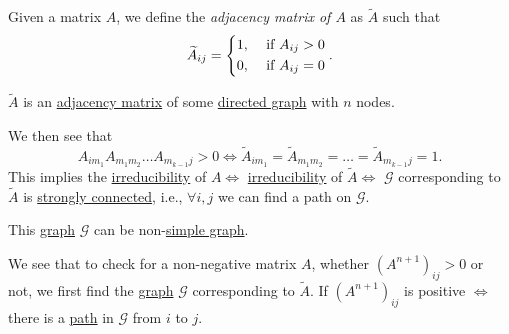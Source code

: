 \begin{definition}\label{def:adjacency-matrix-of-a-matrix}
	Given a matrix \(A\), we define the \emph{adjacency matrix of \(A\)} as \(\widetilde{A} \) such that
	\[
		\widetilde{A}_{ij} = \begin{dcases}
			1, & \text{ if }A_{ij}>0 \\
			0, & \text{ if }A_{ij}=0 \\
		\end{dcases}.
	\]
\end{definition}

\begin{note}
	\(\widetilde{A} \) is an \hyperref[def:adjacency-matrix]{adjacency matrix} of some \hyperref[def:directed-graph]{directed graph} with \(n\) nodes.
\end{note}

We then see that
\[
	A_{im_1} A_{m_1 m_2}\ldots A_{m_{k-1} j} > 0 \iff \widetilde{A}_{im_1} = \widetilde{A}_{m_1 m_2} = \ldots = \widetilde{A}_{m_{k-1}j} = 1.
\]
This implies the \hyperref[def:irreducible]{irreducibility} of \(A \iff\) \hyperref[def:irreducible]{irreducibility} of \(\widetilde{A}\iff\) \(\mathcal{G}\) corresponding to \(\widetilde{A}\) is \hyperref[def:strongly-connected]{strongly connected}, i.e., \(\forall  i, j\) we can find a path on \(\mathcal{G}\).
\begin{remark}
	This \hyperref[def:graph]{graph} \(\mathcal{G}\) can be non-\hyperref[def:simple-graph]{simple graph}.
\end{remark}

We see that to check for a non-negative matrix \(A\), whether \((A^{n+1})_{ij} > 0\) or not, we first find the \hyperref[def:graph]{graph} \(\mathcal{G} \) corresponding to \(\widetilde{A}\). If \((A^{n+1})_{ij}\) is positive \(\iff\) there is a \hyperref[def:path]{path} in \(\mathcal{G}\) from \(i\) to \(j\).